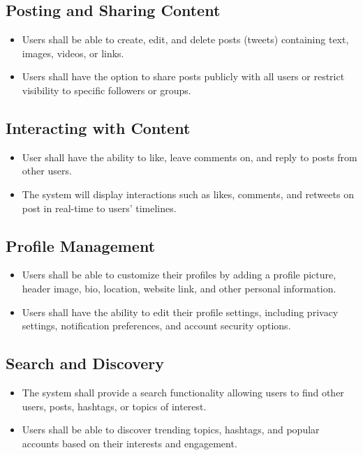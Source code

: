 \documentclass{article}
\begin{document}
\subsection{Posting and Sharing Content}
\begin{itemize}[label=$\bullet$]
    \item Users shall be able to create, edit, and delete posts (tweets) containing text, images, videos, or links.
    \item Users shall have the option to share posts publicly with all users or restrict visibility to specific followers or groups.
\end{itemize}

\subsection{Interacting with Content}
\begin{itemize}[label=$\bullet$]
    \item User shall have the ability to like, leave comments on, and reply to posts from other users.
    \item The system will display interactions such as likes, comments, and retweets on post in real-time to users’ timelines.
\end{itemize}

\subsection{Profile Management}
\begin{itemize}[label=$\bullet$]
    \item Users shall be able to customize their profiles by adding a profile picture, header image, bio, location, website link, and other personal information.
    \item Users shall have the ability to edit their profile settings, including privacy settings, notification preferences, and account security options.
\end{itemize}

\subsection{Search and Discovery}
\begin{itemize}[label=$\bullet$]
    \item The system shall provide a search functionality allowing users to find other users, posts, hashtags, or topics of interest.
    \item Users shall be able to discover trending topics, hashtags, and popular accounts based on their interests and engagement.
\end{itemize}
\end{document}
